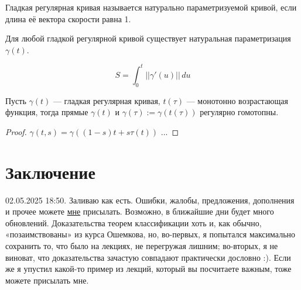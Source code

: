 \begin{definition}
    Гладкая регулярная кривая называется натурально параметризуемой кривой, если длина её вектора скорости равна 1.
\end{definition} 

\begin{statement}
    Для любой гладкой регулярной кривой существует натуральная параметризация $\gamma(t)$.
\end{statement} 

$$S = \int_{0}^{t} ||\gamma'(u)|| \,du$$

\begin{statement}
    Пусть $\gamma(t)$ — гладкая регулярная кривая, $t(\tau)$ — монотонно возрастающая функция, тогда прямые $\gamma(t)$ и $\gamma(\tau):= \gamma(t(\tau))$ регулярно гомотопны.
\end{statement} 
\begin{proof}
    $\gamma(t,s) = \gamma\left((1-s)t + s \tau(t)\right)$ ...
\end{proof} 

\section{Заключение}
02.05.2025 18:50. Заливаю как есть. Ошибки, жалобы, предложения, дополнения и прочее можете \href{https://t.me/egor_tsy}{мне} присылать. Возможно, в ближайшие дни будет много обновлений. Доказательства теорем классификации хоть и, как обычно, «позаимствованы» из курса Ошемкова, но, во-первых, я попытался максимально сохранить то, что было на лекциях, не перегружая лишним; во-вторых, я не виноват, что доказательства зачастую совпадают практически дословно :). Если же я упустил какой-то пример из лекций, который вы посчитаете важным, тоже можете присылать мне.